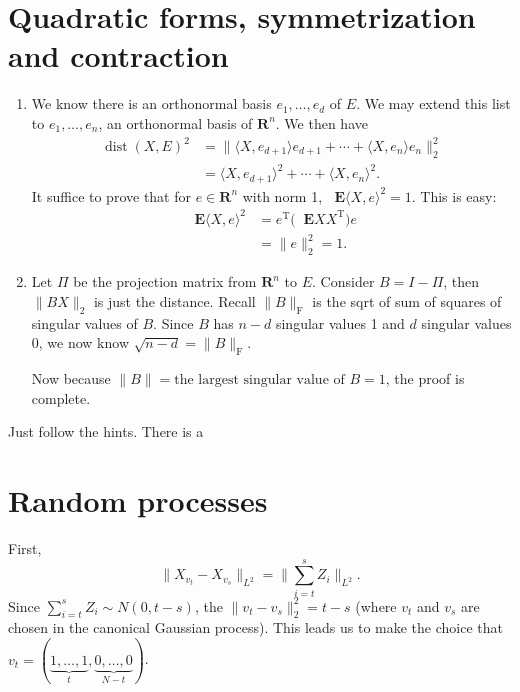 \documentclass[11pt]{article}
\newcommand{\R}{\mathbf{R}}
\newcommand{\inp}[2]{\langle #1, #2 \rangle}
\newcommand{\nm}[1]{\lVert #1 \rVert}
\newcommand{\trp}{\mathrm T}
\newcommand{\E}{\mathop{}\!\mathbf{E}}
\theoremstyle{plain}
\theoremstyle{definition}
\theoremstyle{remark}
\theoremstyle{definition}
\newenvironment{mansol}[1]{%
  \renewcommand\themansolinner{#1}%
  \mansolinner
}{\endmansolinner}
\begin{document}
\newpage
\section{Quadratic forms, symmetrization and contraction}
\begin{mansol}{6.3.4}
    \begin{enumerate}[label=(\alph*)]
        \item We know there is an orthonormal basis $e_1,\ldots,e_d$ of $E$. We may extend this list to $e_1,\ldots,e_n$, an orthonormal basis of $\R^n$. We then have \begin{align*}
        \operatorname{dist}(X,E)^2 & = \nm{\inp{X}{e_{d+1}}e_{d+1} + \cdots + \inp{X}{e_n}e_n}_2^2 \\ & = \inp{X}{e_{d+1}}^2 + \cdots + \inp{X}{e_n}^2.
        \end{align*}
    It suffice to prove that for $e \in \R^n$ with norm 1, $\E \inp{X}{e}^2 = 1$. This is easy: 
    \begin{align*}
        \E \inp{X}{e}^2 & = e^\trp \bigl(\E X X^\trp\bigr) e \\ & = \nm{e}_2^2 = 1.
    \end{align*}
    \item Let $\Pi$ be the projection matrix from $\R^n$ to $E$. Consider $B = I - \Pi$, then $\nm{BX}_2$ is just the distance. Recall $\nm{B}_{\mathrm F}$ is the sqrt of sum of squares of singular values of $B$. Since $B$ has $n - d$ singular values 1 and $d$ singular values 0, we now know $\sqrt{n-d} = \nm{B}_{\mathrm F}$.

    Now because $\nm{B} = \text{the largest singular value of }B = 1$, the proof is complete.
    \end{enumerate}
\end{mansol}

\begin{mansol}{6.5.2}
    Just follow the hints. There is a 
\end{mansol}

\newpage
\section{Random processes}
\begin{mansol}{7.1.13}
    First, \[\nm{X_{v_t} - X_{v_s}}_{L^2} = \Big\lVert\sum_{i=t}^s Z_i\Big\rVert_{L^2}.\] Since $\sum_{i=t}^s Z_i \sim N(0,t-s)$, the $\nm{v_t-v_s}_2^2 = t-s$ (where $v_t$ and $v_s$ are chosen in the canonical Gaussian process). This leads us to make the choice that $v_t = (\underbrace{1,\ldots,1}_{t},\underbrace{0,\ldots,0}_{N-t})$.
\end{mansol}
\end{document}
